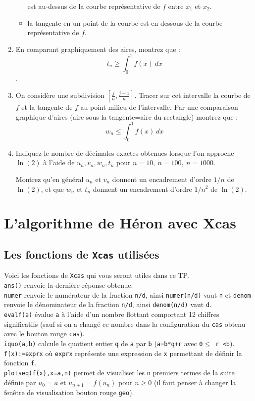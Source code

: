 \documentclass[a4paper,11pt]{book}
\begin{document}
\begin{enumerate}
\begin{itemize}
est au-dessus de la courbe repr\'esentative de $f$ entre $x_1$ et $x_2$.
\item la tangente en un point de la courbe est en-dessous de la
courbe repr\'esentative de $f$.
\end{itemize}
\item En comparant graphiquement des aires,
montrez que :\\
\[ t_n\geq \int _0^1 f(x) \ dx \].
\item On consid\`ere une subdivision $[\frac{j}{n},\frac{j+1}{n}]$.
Tracer sur cet intervalle la courbe de $f$ et la tangente de $f$
au point milieu de l'intervalle. Par une comparaison graphique d'aires
(aire sous la tangente=aire du rectangle) montrez que :\\
\[ w_n \leq \int _0^1 f(x)\ dx \]
\item Indiquez
le nombre de d\'ecimales exactes obtenues lorsque l'on approche $\ln(2)$ \`a 
l'aide de $u_n,v_n,w_n,t_n$ pour $n=10,\ n=100,\ n=1000$.

Montrez qu'en g\'en\'eral $u_n$
et $v_n$ donnent un encadrement d'ordre $1/n$ de $\ln(2)$, et que
 $w_n$ et $t_n$ donnent un encadrement d'ordre $1/n^2$ de $\ln(2)$.
\end{enumerate}

\section{L'algorithme de H\'eron avec Xcas}
\subsection{Les fonctions de {\tt Xcas} utilis\'ees}
Voici les fonctions de {\tt Xcas} qui vous seront utiles dans ce TP.\\ 
{\tt ans()} renvoie la derni\`ere r\'eponse obtenue.\\
{\tt numer} renvoie le num\'erateur de la fraction {\tt n/d}, ainsi {\tt numer(n/d)} vaut {\tt n} et 
{\tt denom} renvoie le d\'enominateur de la fraction {\tt n/d}, ainsi {\tt denom(n/d)} vaut {\tt d}.\\
{\tt evalf(a)} \'evalue {\tt a} \`a l'aide d'un nombre flottant comportant 
12 chiffres significatifs (sauf si on a chang\'e ce nombre dans la 
configuration du {\tt cas} obtenu avec le bouton rouge {\tt cas}).\\
{\tt iquo(a,b)} calcule le quotient entier {\tt q} de {\tt a} par {\tt b} 
({\tt a=b*q+r} avec {\tt 0$\leq$ r <b}).\\  
{\tt f(x):=exprx} o\`u {\tt exprx} repr\'esente une expression de {\tt x} 
permettant de d\'efinir la fonction {\tt f}.\\
{\tt plotseq(f(x),x=a,n)} permet de visualiser les {\tt n} premiers termes de 
la suite d\'efinie par $u_0=a$ et $u_{n+1}=f(u_n)$ pour $n \geq 0$ (il faut 
penser \`a changer la fen\^etre de visualisation bouton rouge {\tt geo}).
\end{document}
